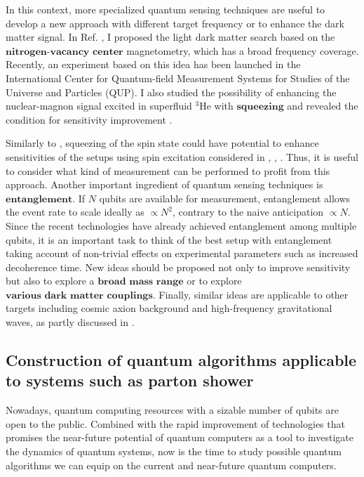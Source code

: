 \documentclass[12pt]{article}
\begin{document}
In this context, more specialized quantum sensing techniques are useful to develop a new approach with different target frequency or to enhance the dark matter signal.
In Ref. \cite{Chigusa:2023hms}, I proposed the light dark matter search based on the $\textbf{nitrogen-vacancy center}$ magnetometry, which has a broad frequency coverage.
Recently, an experiment based on this idea has been launched in the International Center for Quantum-field Measurement Systems for Studies of the Universe and Particles (QUP).
I also studied the possibility of enhancing the nuclear-magnon signal excited in superfluid $\mathrm{^3He}$ with $\textbf{squeezing}$ and revealed the condition for sensitivity improvement \cite{Chigusa:2023szl}.

Similarly to \cite{Chigusa:2023szl}, squeezing of the spin state could have potential to enhance sensitivities of the setups using spin excitation considered in \cite{Chigusa:2020gfs}, \cite{Chigusa:2021mci}, \cite{Chigusa:2023hmz}.
Thus, it is useful to consider what kind of measurement can be performed to profit from this approach.
Another important ingredient of quantum sensing techniques is $\textbf{entanglement}$.
If $N$ qubits are available for measurement, entanglement allows the event rate to scale ideally as $\propto N^2$, contrary to the naive anticipation $\propto N$.
Since the recent technologies have already achieved entanglement among multiple qubits, it is an important task to think of the best setup with entanglement taking account of non-trivial effects on experimental parameters such as increased decoherence time.
New ideas should be proposed not only to improve sensitivity but also to explore a $\textbf{broad mass range}$ or to explore $\textbf{various dark matter couplings}$.
Finally, similar ideas are applicable to other targets including cosmic axion background and high-frequency gravitational waves, as partly discussed in \cite{Chigusa:2023bga}.

\subsection*{Construction of quantum algorithms applicable to systems such as parton shower}

Nowadays, quantum computing resources with a sizable number of qubits are open to the public.
Combined with the rapid improvement of technologies that promises the near-future potential of quantum computers as a tool to investigate the dynamics of quantum systems, now is the time to study possible quantum algorithms we can equip on the current and near-future quantum computers.
\end{document}
